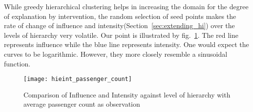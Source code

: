 






While greedy hierarchical clustering helps in increasing the domain for the degree of explanation by intervention, the random selection of seed points makes the rate of change of influence and intensity(Section~\ref{sec:extending_hi}) over the levels of hierarchy very volatile. Our point is illustrated by fig.~\ref{fig:hieint_passenger_count}. The red line represents influence while the blue line represents intensity. One would expect the curves to be logarithmic. However, they more closely resemble a sinusoidal function.
\begin{figure}[h]
\texttt{[image: hieint\_passenger\_count]}
\caption{Comparison of Influence and Intensity against level of hierarchy with average passenger count as observation}
\label{fig:hieint_passenger_count}
\end{figure}

